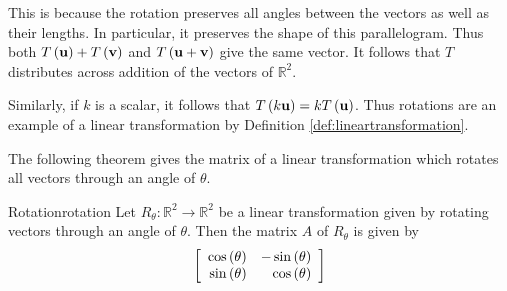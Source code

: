 This is because the rotation preserves all angles between the vectors
as well as their lengths. In particular, it preserves the shape of
this parallelogram. Thus both
$T\left({\bf u}\right)+T\left({\bf v}\right)$ and
$T\left({\bf u}+{\bf v}\right)$ give the same vector. It follows
that $T$ distributes across addition of the vectors of
$\mathbb{R}^{2}$.

Similarly, if $k$ is a scalar, it follows that $T\left(k{\bf u}\right)=kT\left({\bf u}\right)$.
Thus rotations are an example of a
linear transformation by Definition \ref{def:lineartransformation}.

The following theorem gives the matrix of a linear transformation which rotates all vectors through an angle of $\theta$. 

\begin{theorem}{Rotation}{rotation}
Let $R_{\theta}: \mathbb{R}^2 \to \mathbb{R}^2$ be a linear transformation given by rotating vectors through an angle of $\theta$. Then the matrix $A$ of $R_{\theta}$ is given by 
\[
\left[
\begin{array}{rr}
\cos \left( \theta \right) & -\sin \left( \theta \right) \\
\sin \left( \theta \right) & \cos \left( \theta \right)
\end{array}
\right]
\]
\end{theorem}

